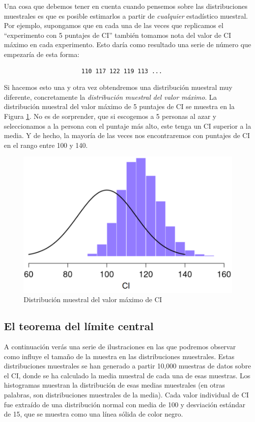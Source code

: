 \documentclass[spanish,]{book}
\begin{document}
Una cosa que debemos tener en cuenta cuando pensemos sobre las
distribuciones muestrales es que es posible estimarlos a partir de
\emph{cualquier} estadístico muestral. Por ejemplo, supongamos que en
cada una de las veces que replicamos el ``experimento con 5 puntajes de
CI'' también tomamos nota del valor de CI máximo en cada experimento.
Esto daría como resultado una serie de número que empezaría de esta
forma:

\begin{verbatim}
                      110 117 122 119 113 ... 
\end{verbatim}

Si hacemos esto una y otra vez obtendremos una distribución muestral muy
diferente, concretamente la \emph{distribución muestral del valor
máximo}. La distribución muestral del valor máximo de 5 puntajes de CI
se muestra en la Figura \ref{fig:sampdistmax}. No es de sorprender, que
si escogemos a 5 personas al azar y seleccionamos a la persona con el
puntaje más alto, este tenga un CI superior a la media. Y de hecho, la
mayoría de las veces nos encontraremos con puntajes de CI en el rango
entre 100 y 140.

\begin{figure}
\includegraphics[width=13.08in]{img/estimation/sampdistmax} \caption{Distribución muestral del valor máximo de CI}\label{fig:sampdistmax}
\end{figure}

\subsection{El teorema del límite central}\label{clt}

A continuación verás una serie de ilustraciones en las que podremos
observar como influye el tamaño de la muestra en las distribuciones
muestrales. Estas distribuciones muestrales se han generado a partir
10,000 muestras de datos sobre el CI, donde se ha calculado la media
muestral de cada una de esas muestras. Los histogramas muestran la
distribución de esas medias muestrales (en otras palabras, son
distribuciones muestrales de la media). Cada valor individual de CI fue
extraído de una distribución normal con media de 100 y desviación
estándar de 15, que se muestra como una línea sólida de color negro.
\end{document}
